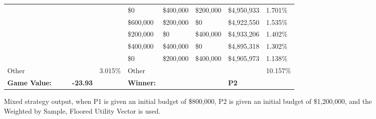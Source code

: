 \documentclass[11pt]{article}
\begin{document}
\begin{figure}
\begin{tabular}{ |p{1.0cm}p{1.0cm}p{1.0cm}p{2.0cm}|p{1.0cm}||p{1.0cm}p{1.0cm}p{1.0cm}p{2.0cm}|p{1.0cm}|}
&&&&&\$0 & \$400,000 & \$200,000 & \$4,950,933 & 1.701\% \\
&&&&&\$600,000 & \$200,000 & \$0 & \$4,922,550 & 1.535\% \\
&&&&&\$200,000 & \$0 & \$400,000 & \$4,933,206 & 1.402\% \\
&&&&&\$400,000 & \$400,000 & \$0 & \$4,895,318 & 1.302\% \\
&&&&&\$0 & \$200,000 & \$400,000 & \$4,905,973 & 1.138\% \\
\hline
Other &&&& 3.015\% & Other &&&& 10.157\% \\
\hline
\small \textbf{Game Value:} &&& \small \textbf{-23.93} && \small \textbf{Winner:} &&& \small \textbf{P2}&\\
\hline
\end{tabular}
\caption{Mixed strategy output, when P1 is given an initial budget of \$800,000, P2 is given an initial budget of \$1,200,000, and the Weighted by Sample, Floored Utility Vector is used.}
\label{8v12table.3}
\end{figure}
\end{document}
